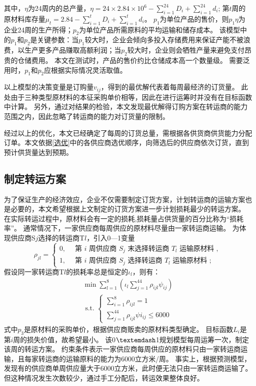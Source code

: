 \noindent 其中，$\eta$为24周内的总产量，$\eta=24 \times 2.84\times10^6-\sum_{i=1}^{24}D_i+\sum_{i=1}^{24}d_i$;
第$t$周的原材料库存量$\mu_t=2.84-\sum_{i=1}^{t}D_i+\sum_{i=1}^{t}d_i$。
$p_1$为单位产品的售价，则$p_1\eta$为企业24周的生产所得；$p_2$为单位产品所需原料的平均运输和储存成本。
该模型中的$p_1$和$p_2$是关键参数：当$p_1$较大时，企业会倾向多投入存储费用来保证产能不被浪费，以生产更多产品赚取高额利润；当$p_2$较大时，企业则会牺牲产量来避免支付昂贵的仓储费用。
本文在测试时，产品的售价约比仓储成本高一个数量级。
需要泛用时，$p_1$和$p_2$应根据实际情况灵活取值。

以上模型的决策变量是订购量$v_{ij}$，得到的最优解代表着每周最经济的订货量。
此处由于三种类型原材料的本征采购单价相等，因此在进行运筹时并没有在目标函数中计算。
另外，通过对结果的检验，本文发现最优解得订购方案在转运商的能力范围之内，因此忽略了转运商的能力对订货量的限制。

经过以上的优化，本文已经确定了每周的订货总量，需根据各供货商供货能力分配订单。本文依据\ref{选优}中的各供应商选优顺序，向筛选后的供应商依次订货，直到预计供货量达到预期。

\subsection{制定转运方案}

为了保证生产的经济效应，企业不仅需要制定订货方案，计划转运商的运输方案也是必要的，本文希望根据上文制定的订货方案进一步计划损耗最少的转运方案。
在实际转运过程中，原材料会有一定的损耗,损耗量占供货量的百分比称为“损耗率”。
通常情况下，一家供应商每周供应的原材料尽量由一家转运商运输。
为体现供应商S$j$选择的转运商T$l$，引入0—1变量
\begin{equation}
\rho_{j l}=\left\{\begin{array}{l}
0,\quad  \text { 第 } i \text { 周供应商 } S_j \text { 末选择转运商 } T_l \text { 运输原材料 }, \\
1,\quad  \text { 第 } i \text { 周供应商 } S_j \text { 选择转运商 } T_l \text { 运输原材料 };
\end{array}\right.
\end{equation}
假设同一家转运商T$l$的损耗率总是恒定的$\iota_l$，则有：
\begin{equation}
\begin{array}{l}
\min \sum_{l=1}^{8}\left(\iota_{l} \sum_{j=1}^{44} \rho_{i j l} \psi_{i j}\right) \\
\text { s.t. }\left\{\begin{array}{l}
\sum_{i=1}^{8} \rho_{i j l}=1 \\
\sum_{j=1}^{44} \rho_{i j l} \psi i_{i j} \leq 6000
\end{array}\right.
\end{array}
\end{equation}
式中$p_3$是原材料的采购单价，根据供应商贩卖的原材料类型确定。
目标函数$L_i$是第$i$周的损失价值，故希望最小。
该0$\textemdash$1规划模型每周运筹一次，制定该周的转运方案。
约束条件表示一家供应商每周供应的原材料只由一家转运商运输，且每家转运商的运输原料的能力为6000立方米/周。
事实上，根据预测模型，发现有的供应商单周供应量大于6000立方米，此时便无法只由一家转运商运输了。
但这种情况发生次数较少，通过手工分配后，转运效果整体良好。

